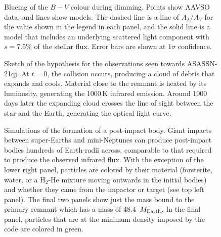 \documentclass[sn-nature]{sn-jnl}%
\begin{document}
\begin{figure}
    \centering
    \caption{Blueing of the $B-V$ colour during dimming.
    Points show AAVSO data, and lines show models.
    The dashed line is a line of $A_\lambda/A_V$ for the value shown in the legend in each panel, and the solid line is a model that includes an underlying scattered light component with $s=7.5$\% of the stellar flux.
    Error bars are shown at $1\sigma$ confidence.
}
    \label{fig:blueing}
\end{figure}

\begin{figure}
    \centering
    \caption{Sketch of the hypothesis for the observations seen towards ASASSN-21qj.
    At $t=0$, the collision occurs, producing a cloud of debris that expands and cools.
    Material close to the remnant is heated by its luminosity, generating the 1000\,K infrared emission.
    Around 1000 days later the expanding cloud crosses the line of sight between the star and the Earth, generating the optical light curve.}
    \label{fig:hypothesis}
\end{figure}


\begin{figure}
    \centering
    \caption{Simulations of the formation of a post-impact body.
    Giant impacts between super-Earths and mini-Neptunes can produce post-impact bodies hundreds of Earth-radii across, comparable to that required to produce the observed infrared flux. With the exception of the lower right panel, particles are colored by their material (forsterite, water, or a H$_2$-He mixture moving outwards in the initial bodies) and whether they came from the impactor or target (see top left panel). The final two panels show just the mass bound to the primary remnant which has a mass of 48.4~$M_{\rm Earth}$. In the final panel, particles that are at the minimum density imposed by the code are colored in green.}
    \label{fig:SPH}
\end{figure}
\end{document}
